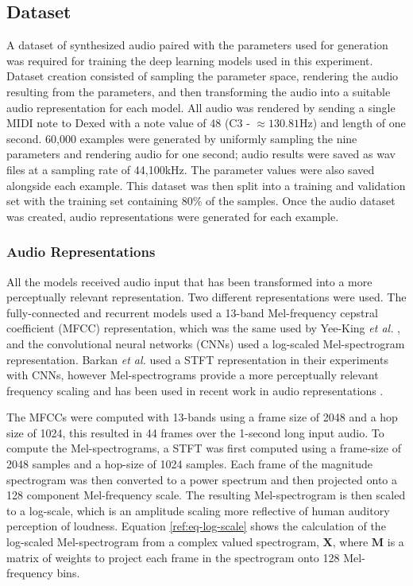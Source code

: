 \subsection{Dataset}
A dataset of synthesized audio paired with the parameters used for generation was required for training the deep learning models used in this experiment. Dataset creation consisted of sampling the parameter space, rendering the audio resulting from the parameters, and then transforming the audio into a suitable audio representation for each model. All audio was rendered by sending a single MIDI note to Dexed with a note value of 48 (C3 - $\approx 130.81$Hz) and length of one second. 60,000 examples were generated by uniformly sampling the nine parameters and rendering audio for one second; audio results were saved as wav files at a sampling rate of 44,100kHz. The parameter values were also saved alongside each example. This dataset was then split into a training and validation set with the training set containing 80\% of the samples. Once the audio dataset was created, audio representations were generated for each example.

\subsubsection{Audio Representations}
All the models received audio input that has been transformed into a more perceptually relevant representation. Two different representations were used. The fully-connected and recurrent models used a 13-band Mel-frequency cepstral coefficient (MFCC) representation, which was the same used by Yee-King \textit{et al.} \cite{yee2018automatic}, and the convolutional neural networks (CNNs) used a log-scaled Mel-spectrogram representation. Barkan \textit{et al.} \cite{barkan2019inversynth} used a STFT representation in their experiments with CNNs, however Mel-spectrograms provide a more perceptually relevant frequency scaling and has been used in recent work in audio representations \cite{cramer:learnmore:icassp:19, hershey2017cnn}.

The MFCCs were computed with 13-bands using a frame size of 2048 and a hop size of 1024, this resulted in 44 frames over the 1-second long input audio. To compute the Mel-spectrograms, a STFT was first computed using a frame-size of 2048 samples and a hop-size of 1024 samples. Each frame of the magnitude spectrogram was then converted to a power spectrum and then projected onto a 128 component Mel-frequency scale. The resulting Mel-spectrogram is then scaled to a log-scale, which is an amplitude scaling more reflective of human auditory perception of loudness. Equation \ref{ref:eq-log-scale} shows the calculation of the log-scaled Mel-spectrogram from a complex valued spectrogram, $\textbf{X}$, where $\textbf{M}$ is a matrix of weights to project each frame in the spectrogram onto 128 Mel-frequency bins.


